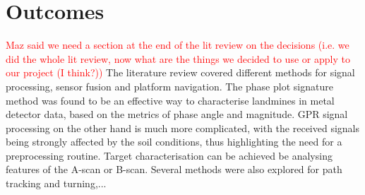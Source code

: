 \documentclass[main.tex]{subfiles}
\begin{document}
\section{Outcomes}
\textcolor{red}{Maz said we need a section at the end of the lit review on the decisions (i.e. we did the whole lit review, now what are the things we decided to use or apply to our project (I think?))}
The literature review covered different methods for signal processing, sensor fusion and platform navigation. The phase plot signature method was found to be an effective way to characterise landmines in metal detector data, based on the metrics of phase angle and magnitude. GPR signal processing on the other hand is much more complicated, with the received signals being strongly affected by the soil conditions, thus highlighting the need for a preprocessing routine. Target characterisation can be achieved be analysing features of the A-scan or B-scan. Several methods were also explored for path tracking and turning,... 
\end{document}

